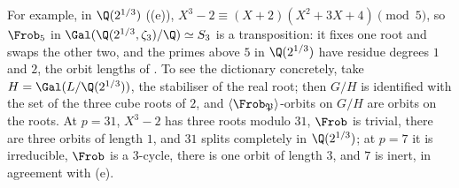For example, in $\Q(2^{1/3})$ ((e)), $X^3-2\equiv(X+2)(X^2+3X+4)\pmod5$, so $\Frob_5$ in $\Gal(\Q(2^{1/3},\zeta_3)/\Q)\simeq S_3$ is a
transposition: it fixes one root and swaps the other two, and the primes above $5$ in $\Q(2^{1/3})$ have residue degrees $1$ and $2$, the orbit
lengths of . To see the dictionary concretely, take $H=\Gal(L/\Q(2^{1/3}))$, the stabiliser of the real root; then $G/H$ is
identified with the set of the three cube roots of $2$, and $\langle\Frob_{\mathfrak P}\rangle$-orbits on $G/H$ are orbits on the roots. At $p=31$, $X^3-2$ has
three roots modulo $31$, $\Frob$ is trivial, there are three orbits of length $1$, and $31$ splits completely in $\Q(2^{1/3})$; at $p=7$ it is irreducible,
$\Frob$ is a $3$-cycle, there is one orbit of length $3$, and $7$ is inert, in agreement with (e).

